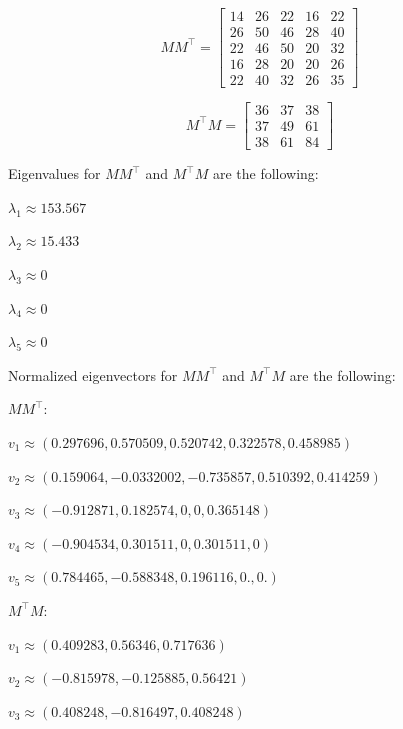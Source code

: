 \documentclass[12pt]{report}
\begin{document}
\[
MM^\intercal =
\begin{bmatrix}
14 & 26 & 22 & 16 & 22 \\
26 & 50 & 46 & 28 & 40 \\
22 & 46 & 50 & 20 & 32 \\
16 & 28 & 20 & 20 & 26 \\
22 & 40 & 32 & 26 & 35
\end{bmatrix}
\]

\[
M^\intercal M =
\begin{bmatrix}
36 & 37 & 38 \\
37 & 49 & 61 \\
38 & 61 & 84
\end{bmatrix}
\]

\begin{center}
Eigenvalues for $MM^\intercal$ and $M^\intercal  M$ are the following:

\hspace{3mm}

$\lambda_1 \approx 153.567$

$\lambda_2 \approx 15.433$

$\lambda_3 \approx 0$

$\lambda_4 \approx 0$

$\lambda_5 \approx 0$

\hspace{3mm}

Normalized eigenvectors for $MM^\intercal$ and $M^\intercal  M$ are the following:

\hspace{3mm}

$MM^\intercal$:

$v_1 \approx (0.297696, 0.570509, 0.520742, 0.322578, 0.458985) $

$v_2 \approx (0.159064, -0.0332002, -0.735857, 0.510392, 0.414259) $

$v_3 \approx(-0.912871, 0.182574, 0, 0, 0.365148) $

$v_4 \approx(-0.904534, 0.301511, 0, 0.301511, 0)$

$v_5 \approx(0.784465, -0.588348, 0.196116, 0., 0.) $

\hspace{3mm}

$M^\intercal  M$:

$v_1 \approx (0.409283, 0.56346, 0.717636) $

$v_2 \approx (-0.815978, -0.125885, 0.56421)$

$v_3 \approx (0.408248, -0.816497, 0.408248) $

\end{center}
\end{document}
